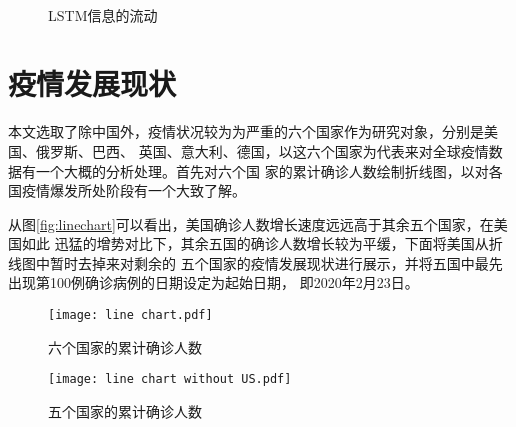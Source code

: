 \documentclass[lang=cn,11.9pt,a4paper,cite=authoryear]{elegantpaper}
\begin{document}
\begin{figure}[htp]
	\centering
	\\
    \caption{LSTM信息的流动}
	\label{fig:LSTM}
\end{figure}

\section{疫情发展现状}

本文选取了除中国外，疫情状况较为为严重的六个国家作为研究对象，分别是美国、俄罗斯、巴西、
英国、意大利、德国，以这六个国家为代表来对全球疫情数据有一个大概的分析处理。首先对六个国
家的累计确诊人数绘制折线图，以对各国疫情爆发所处阶段有一个大致了解。

从图\ref{fig:linechart}可以看出，美国确诊人数增长速度远远高于其余五个国家，在美国如此
迅猛的增势对比下，其余五国的确诊人数增长较为平缓，下面将美国从折线图中暂时去掉来对剩余的
五个国家的疫情发展现状进行展示，并将五国中最先出现第100例确诊病例的日期设定为起始日期，
即2020年2月23日。

\begin{figure}[htp]
	\centering
		\begin{minipage}{0.48\linewidth}
			\centering
			\texttt{[image: line chart.pdf]}
			\caption{六个国家的累计确诊人数}
			\label{fig:linechart}
		\end{minipage}
		\begin{minipage}{0.48\linewidth}
			\centering
			\texttt{[image: line chart without US.pdf]}
			\caption{五个国家的累计确诊人数}
			\label{fig:noUS}
		\end{minipage}
\end{figure}
\end{document}
